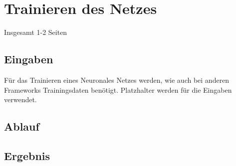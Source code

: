 \section{Trainieren des Netzes}
\label{sec:trainierenDesNetzes}
\printsubchapterauthor{\authorNiklas}
Insgesamt 1-2 Seiten


\subsection{Eingaben}
\label{sec:eingaben}
Für das Trainieren eines Neuronales Netzes werden, wie auch bei anderen Frameworks Trainingsdaten benötigt.
Platzhalter werden für die Eingaben verwendet.


\subsection{Ablauf}
\label{sec:ablauf}


\subsection{Ergebnis}
\label{sec:ergebnis}
